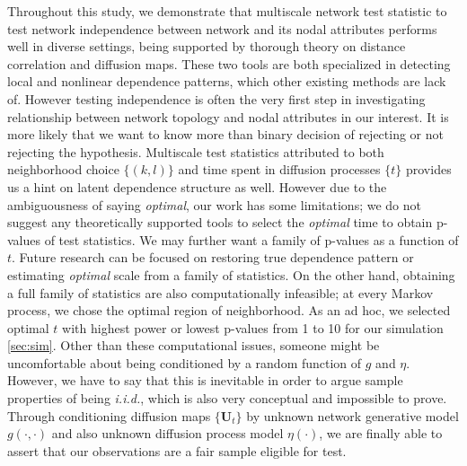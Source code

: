 \documentclass[12pt]{article}
\theoremstyle{definition}
\begin{document}
Throughout this study, we demonstrate that multiscale network test statistic to test network independence between network and its nodal attributes performs well in diverse settings, being supported by thorough theory on distance correlation and diffusion maps. These two tools are both specialized in detecting local and nonlinear dependence patterns, which other existing methods are lack of. However testing independence is often the very first step in investigating relationship between network topology and nodal attributes in our interest. It is more likely that we want to know more than binary decision of rejecting or not rejecting the hypothesis. Multiscale test statistics attributed to both neighborhood choice $\{ (k,l)  \}$ and time spent in diffusion processes $\{ t \}$ provides us a hint on latent dependence structure as well.  However due to the ambiguousness of saying \textit{optimal}, our work has some limitations; we do not suggest any theoretically supported tools to select the \textit{optimal} time to obtain p-values of test statistics. We may further want a family of p-values as a function of $t$. Future research can be focused on restoring true dependence pattern or estimating \textit{optimal} scale from a family of statistics. On the other hand, obtaining a full family of statistics are also computationally infeasible; at every Markov process, we chose the optimal region of neighborhood. As an ad hoc, we selected optimal $t$ with highest power or lowest p-values from 1 to 10 for our simulation \ref{sec:sim}.  Other than these computational issues, someone might be uncomfortable about being conditioned by a random function of $g$ and $\eta$.  However, we have to say that this is inevitable in order to argue sample properties of being \textit{i.i.d.}, which is also very conceptual and impossible to prove. Through conditioning diffusion maps $\{ \mathbf{U}_{t} \}$ by unknown network generative model $g(\cdot, \cdot)$ and also unknown diffusion process model $\eta(\cdot)$, we are finally able to assert that our observations are a fair sample eligible for test. 
	
\end{document}
